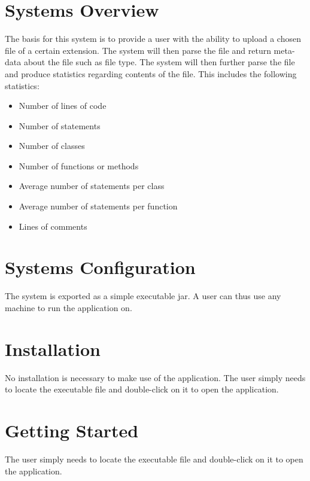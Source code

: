 \documentclass[11pt]{article}
\begin{document}


\setcounter{tocdepth}{3}
\setcounter{secnumdepth}{5}
\tableofcontents

\newpage
\section{Systems Overview}
The basis for this system is to provide a user with the ability to upload a chosen file of a certain extension. The system will then parse the file and return meta-data about the file such as file type. The system will then further parse the file and produce statistics regarding contents of the file. This includes the following statistics:
\begin{itemize}
\item Number of lines of code
\item Number of statements
\item Number of classes
\item Number of functions or methods
\item Average number of statements per class
\item Average number of statements per function
\item Lines of comments
\end{itemize}

\section{Systems Configuration}
The system is exported as a simple executable jar. A user can thus use any machine to run the application on.

\section{Installation}
No installation is necessary to make use of the application. The user simply needs to locate the executable file and double-click on it to open the application.

\section{Getting Started}
The user simply needs to locate the executable file and double-click on it to open the application.
\end{document}
